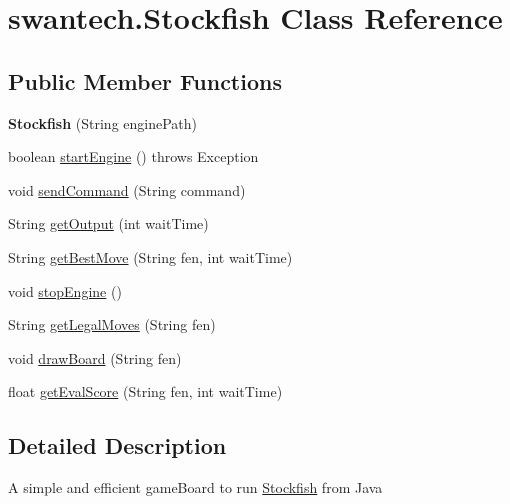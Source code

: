 \hypertarget{classswantech_1_1_stockfish}{}\section{swantech.\+Stockfish Class Reference}
\label{classswantech_1_1_stockfish}
\subsection*{Public Member Functions}
\begin{DoxyCompactItemize}
\item 
\hypertarget{classswantech_1_1_stockfish_a71a5472eb04f588e05418aec0bbbb167}{}{\bfseries Stockfish} (String engine\+Path)\label{classswantech_1_1_stockfish_a71a5472eb04f588e05418aec0bbbb167}

\item 
boolean \hyperlink{classswantech_1_1_stockfish_a19ab1ebc8d457f5743443bebe8ddd252}{start\+Engine} ()  throws Exception
\item 
void \hyperlink{classswantech_1_1_stockfish_a0b971d0f645065262487fb597347d74f}{send\+Command} (String command)
\item 
String \hyperlink{classswantech_1_1_stockfish_ae3766542f6513e9108d6e9ac0f6ea26b}{get\+Output} (int wait\+Time)
\item 
String \hyperlink{classswantech_1_1_stockfish_ab07795178cafa2c3f267ea274f4937be}{get\+Best\+Move} (String fen, int wait\+Time)
\item 
void \hyperlink{classswantech_1_1_stockfish_af97e469fd321bac056aed5251caa7284}{stop\+Engine} ()
\item 
String \hyperlink{classswantech_1_1_stockfish_a3e4c08a813a401dad9c0a8d98930beb0}{get\+Legal\+Moves} (String fen)
\item 
void \hyperlink{classswantech_1_1_stockfish_a15ce41395a20cc5be33df45b527de904}{draw\+Board} (String fen)
\item 
float \hyperlink{classswantech_1_1_stockfish_ad7bf5b45f2fe6b4d60827c734f509a65}{get\+Eval\+Score} (String fen, int wait\+Time)
\end{DoxyCompactItemize}


\subsection{Detailed Description}
A simple and efficient game\+Board to run \hyperlink{classswantech_1_1_stockfish}{Stockfish} from Java

